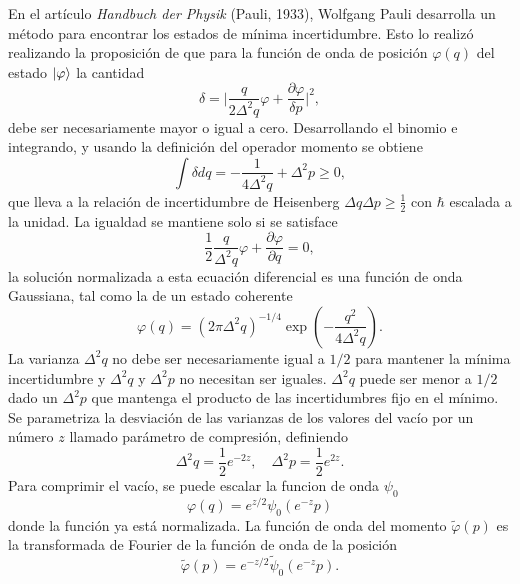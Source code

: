 En el artículo \textit{Handbuch der Physik} (Pauli, 1933), Wolfgang Pauli desarrolla un método para encontrar los estados de mínima incertidumbre. Esto lo realizó realizando la proposición de que para la función de onda de posición $\varphi(q)$ del estado $\ket{\varphi}$ la cantidad
\begin{equation}
  \delta = \big| \frac{q }{2\Delta^2 q}\varphi + \frac{\partial \varphi}{\delta p} \big|^2,
\end{equation}
debe ser necesariamente mayor o igual a cero. Desarrollando el binomio e integrando, y usando la definición del operador momento se obtiene
\begin{equation}
  \int \delta dq = -\frac{1}{4\Delta^2 q} + \Delta^2 p \geq 0,
\end{equation}
que lleva a la relación de incertidumbre de Heisenberg $\Delta q \Delta p \geq \frac{1}{2}$ con $\hbar$ escalada a la unidad. La igualdad se mantiene solo si se satisface
\begin{equation}
  \frac{1}{2}\frac{q }{\Delta ^2 q} \varphi + \frac{\partial \varphi}{\partial q } = 0,
\end{equation}
la solución normalizada a esta ecuación diferencial es una función de onda Gaussiana, tal como la de un estado coherente
\begin{equation}
  \varphi(q) = (2\pi\Delta^2q)^{-1/4}\exp{\left( -\frac{q^2}{4\Delta^2 q} \right)}.
\end{equation}
La varianza $\Delta^2 q$ no debe ser necesariamente igual a $1/2$ para mantener la mínima incertidumbre y $\Delta^2 q$ y $\Delta^2 p$ no necesitan ser iguales. $\Delta^2 q$ puede ser menor a $1/2$ dado un $\Delta^2 p$ que mantenga el producto de las incertidumbres fijo en el mínimo. Se parametriza la desviación de las varianzas de los valores del vacío por un número $z$ llamado parámetro de compresión, definiendo
\begin{equation}
  \Delta^2 q = \frac{1}{2}e^{-2z}, \quad \Delta ^2 p = \frac{1}{2}e^{2z}.
\end{equation}
Para comprimir el vacío, se puede escalar la funcion de onda $\psi_0$
\begin{equation}
  \varphi(q) = e^{z/2}\psi_0(e^{-z}p)
\end{equation}
donde la función ya está normalizada. La función de onda del momento $\tilde{\varphi}(p)$ es la transformada de Fourier de la función de onda de la posición
\begin{equation}
  \tilde{\varphi}(p) = e^{-z/2}\tilde{\psi}_0(e^{-z}p).
\end{equation}
